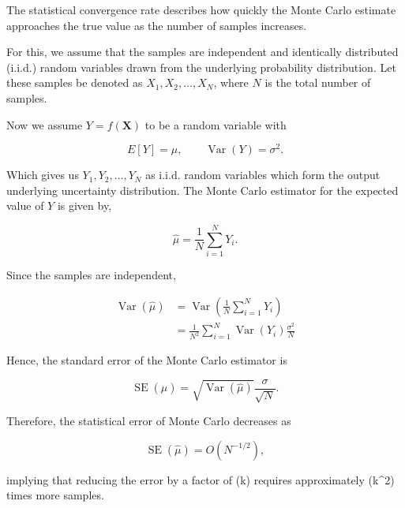 \documentclass[
  letterpaper,
  DIV=11,
  numbers=noendperiod,
  oneside]{scrartcl}
\begin{document}
\begin{tcolorbox}[enhanced jigsaw, arc=.35mm, bottomrule=.15mm, bottomtitle=1mm, breakable, colback=white, colbacktitle=quarto-callout-tip-color!10!white, colframe=quarto-callout-tip-color-frame, coltitle=black, left=2mm, leftrule=.75mm, opacityback=0, opacitybacktitle=0.6, rightrule=.15mm, title=\textcolor{quarto-callout-tip-color}{\faLightbulb}\hspace{0.5em}{Monte-Carlo Standard Error}, titlerule=0mm, toprule=.15mm, toptitle=1mm]

The statistical convergence rate describes how quickly the Monte Carlo
estimate approaches the true value as the number of samples increases.

For this, we assume that the samples are independent and identically
distributed (i.i.d.) random variables drawn from the underlying
probability distribution. Let these samples be denoted as
\(X_1, X_2, \ldots, X_N\), where \(N\) is the total number of samples.

Now we assume \(Y=f(\mathbf{X})\) to be a random variable with

\[
E[Y]=\mu,\qquad \operatorname{Var}(Y)=\sigma^2.
\]

Which gives us \(Y_1, Y_2, \ldots, Y_N\) as i.i.d. random variables
which form the output underlying uncertainty distribution. The Monte
Carlo estimator for the expected value of \(Y\) is given by,

\[
\hat{\mu}=\frac{1}{N}\sum_{i=1}^{N}Y_i.
\]

Since the samples are independent,

\[
\begin{aligned}
\operatorname{Var}(\hat{\mu})&= \operatorname{Var}\left(\frac{1}{N}\sum_{i=1}^{N}Y_i\right)\\&=\frac{1}{N^2}\sum_{i=1}^{N}\operatorname{Var}(Y_i)\frac{\sigma^2}{N}
\end{aligned}
\]

Hence, the standard error of the Monte Carlo estimator is

\[
\boxed{
\operatorname{SE}(\hat{\mu})=\sqrt{\operatorname{Var}(\hat{\mu})}\frac{\sigma}{\sqrt{N}}.
}
\]

Therefore, the statistical error of Monte Carlo decreases as

\[
\boxed{
\operatorname{SE}(\hat{\mu})=O(N^{-1/2}),
}
\]

implying that reducing the error by a factor of (k) requires
approximately (k\^{}2) times more samples.

\end{tcolorbox}
\end{document}
